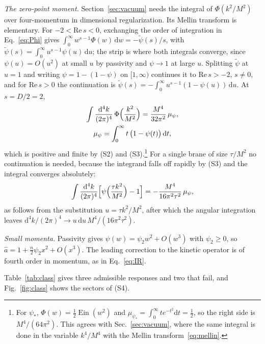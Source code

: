 \documentclass[aps,prd,10pt,twocolumn,superscriptaddress,nofootinbib,floatfix,longbibliography]{revtex4-2}
\newcommand{\dd}{\mathrm{d}}
\newcommand{\Ein}{\operatorname{Ein}}
\begin{document}
\textit{The zero-point moment.} Section~\ref{sec:vacuum} needs the integral of $\Phi(k^2/M^2)$ over four-momentum in dimensional regularization. Its Mellin transform is elementary. For $-2<\mathrm{Re}\,s<0$, exchanging the order of integration in Eq.~\eqref{eq:Phi} gives $\int_0^\infty w^{s-1}\Phi(w)\,\dd w=-\tilde\psi(s)/s$, with $\tilde\psi(s)=\int_0^\infty u^{s-1}\psi(u)\,\dd u$; the strip is where both integrals converge, since $\psi(u)=O(u^2)$ at small $u$ by passivity and $\psi\to1$ at large $u$. Splitting $\tilde\psi$ at $u=1$ and writing $\psi=1-(1-\psi)$ on $[1,\infty)$ continues it to $\mathrm{Re}\,s>-2$, $s\ne0$, and for $\mathrm{Re}\,s>0$ the continuation is $\tilde\psi(s)=-\int_0^\infty u^{s-1}(1-\psi(u))\,\dd u$. At $s=D/2=2$,
\begin{equation}
\label{eq:moment}
\begin{gathered}
\int\frac{\dd^4k}{(2\pi)^4}\,\Phi\Bigl(\frac{k^2}{M^2}\Bigr)=\frac{M^4}{32\pi^2}\,\mu_\psi,\\
\mu_\psi=\int_0^\infty t\,\bigl(1-\psi(t)\bigr)\,\dd t ,
\end{gathered}
\end{equation}
which is positive and finite by (S2) and (S3).\footnote{For $\psi_*$, $\Phi(w)=\frac12\Ein(w^2)$ and $\mu_{\psi_*}=\int_0^\infty te^{-t^2}\dd t=\frac12$, so the right side is $M^4/(64\pi^2)$. This agrees with Sec.~\ref{sec:vacuum}, where the same integral is done in the variable $k^4/M^4$ with the Mellin transform~\eqref{eq:mellin}.} For a single brane of size $\tau/M^2$ no continuation is needed, because the integrand falls off rapidly by (S3) and the integral converges absolutely:
\begin{equation}
\label{eq:moment1}
\int\frac{\dd^4k}{(2\pi)^4}\Bigl[\psi\Bigl(\frac{\tau k^2}{M^2}\Bigr)-1\Bigr]=-\frac{M^4}{16\pi^2\tau^2}\,\mu_\psi ,
\end{equation}
as follows from the substitution $u=\tau k^2/M^2$, after which the angular integration leaves $\dd^4k/(2\pi)^4\to u\,\dd u\,M^4/(16\pi^2\tau^2)$.

\textit{Small momenta.} Passivity gives $\psi(w)=\psi_2w^2+O(w^3)$ with $\psi_2\ge0$, so $\hat a=1+\frac n2\psi_2x^2+O(x^3)$. The leading correction to the kinetic operator is of fourth order in momentum, as in Eq.~\eqref{eq:IR}.

Table~\ref{tab:class} gives three admissible responses and two that fail, and Fig.~\ref{fig:class} shows the sectors of (S4).
\end{document}
